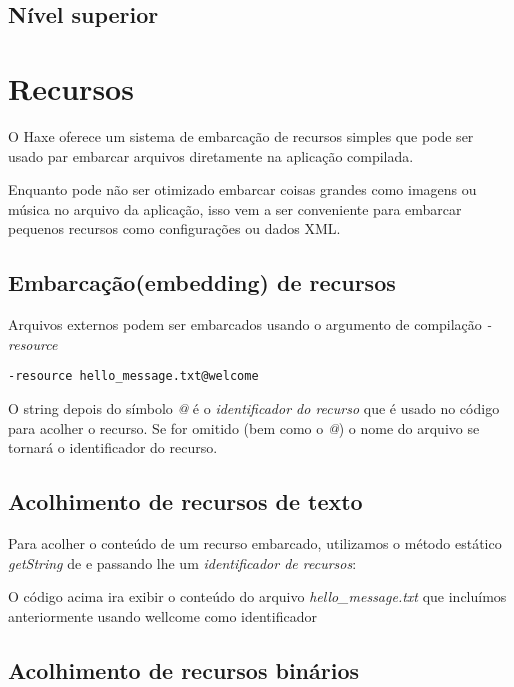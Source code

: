\subsection{Nível superior}
\label{cr-completion-toplevel}

\section{Recursos}
\label{cr-resources}

O Haxe oferece um sistema de embarcação de recursos simples que pode ser usado par embarcar arquivos diretamente na aplicação compilada.

Enquanto pode não ser otimizado embarcar coisas grandes como imagens ou música no arquivo da aplicação, isso vem a ser conveniente para embarcar pequenos recursos como configurações ou dados XML.

\subsection{Embarcação(embedding) de recursos}
\label{cr-resources-embed}

Arquivos externos podem ser embarcados usando o argumento de compilação \emph{-resource}

\begin{lstlisting}
-resource hello_message.txt@welcome
\end{lstlisting}

O string depois do símbolo \emph{@} é o \emph{identificador do recurso} que é usado no código para acolher o recurso. Se for omitido (bem como o \emph{@}) o nome do arquivo se tornará o identificador do recurso.

\subsection{Acolhimento de recursos de texto}
\label{cr-resources-getString}

Para acolher o conteúdo de um recurso embarcado, utilizamos o método estático \emph{getString} de  e passando lhe um \emph{identificador de recursos}:


O código acima ira exibir o conteúdo do arquivo \emph{hello_message.txt} que incluímos anteriormente usando wellcome como identificador

\subsection{Acolhimento de recursos binários}
\label{cr-resources-getBytes}

